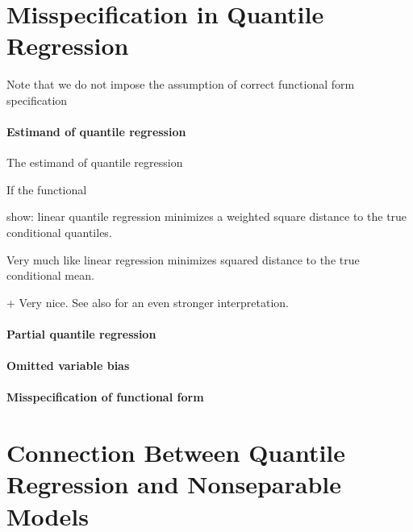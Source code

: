  
 
 
 
 \newpage 
 
 
 \section{Misspecification in Quantile Regression}
 
  Note that we do not impose the assumption of correct functional form specification
 
 \paragraph{Estimand of quantile regression} 
 
 The estimand of quantile regression 
 
 If the functional 
 
 \cite{Angrist2006QuantileRegressionMisspecification} show: linear quantile regression minimizes a weighted square distance to the true conditional quantiles.
 
 Very much like linear regression minimizes squared distance to the true conditional mean.
 
 
 \cite{Angrist2006QuantileRegressionMisspecification} + 
 Very nice. See also \cite{Kato2017UsingLinearQuantile} for an even stronger interpretation.
 
 
 \paragraph{Partial quantile regression}
 
 
 	

 	
  
 		
 	
 \paragraph{Omitted variable bias}
 
 
 \paragraph{Misspecification of functional form}
 
 \newpage  
 
 \section{Connection Between Quantile Regression and  Nonseparable Models}
 

